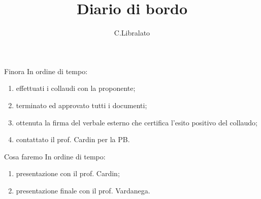 \documentclass{beamer}
\title{Diario di bordo}
\author[C.Libralato]{C.Libralato}
\begin{document}
{
\begin{frame}
    \titlepage
\end{frame}
}

\begin{frame}{Finora}
    In ordine di tempo:
    \begin{enumerate}
        \setlength{\itemsep}{0.9em}
        \item effettuati i collaudi con la proponente;
        \item terminato ed approvato tutti i documenti;
        \item ottenuta la firma del verbale esterno che certifica l'esito positivo del collaudo;
        \item contattato il prof. Cardin per la PB.
    
    \end{enumerate}
\end{frame}

\begin{frame}{Cosa faremo}
    In ordine di tempo:
    \begin{enumerate}
        \setlength{\itemsep}{1.2em}
        \item presentazione con il prof. Cardin;
        \item presentazione finale con il prof. Vardanega.
        
    \end{enumerate}
\end{frame}
\end{document}
